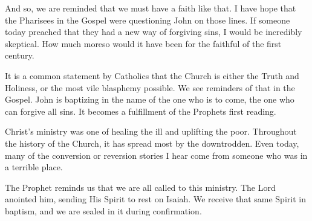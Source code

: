 \documentclass[12pt]{article}[titlepage]
\newcommand{\1}{\={a}}
\newcommand{\2}{\={e}}
\newcommand{\3}{\={\i}}
\newcommand{\4}{\=o}
\newcommand{\5}{\=u}
\newcommand{\6}{\={A}}
\renewcommand{\,}{\textsuperscript{,}}
\begin{document}
And so, we are reminded that we must have a faith like that.
I have hope that the Pharisees in the Gospel were questioning John on those lines.
If someone today preached that they had a new way of forgiving sins, I would be incredibly skeptical.
How much moreso would it have been for the faithful of the first century.

It is a common statement by Catholics that the Church is either the Truth and Holiness, or the most vile blasphemy possible.
We see reminders of that in the Gospel.
John is baptizing in the name of the one who is to come, the one who can forgive all sins.
It becomes a fulfillment of the Prophets first reading.

Christ's ministry was one of healing the ill and uplifting the poor.
Throughout the history of the Church, it has spread most by the downtrodden.
Even today, many of the conversion or reversion stories I hear come from someone who was in a terrible place.

The Prophet reminds us that we are all called to this ministry.
The Lord anointed him, sending His Spirit to rest on Isaiah.
We receive that same Spirit in baptism, and we are sealed in it during confirmation.
\end{document}
